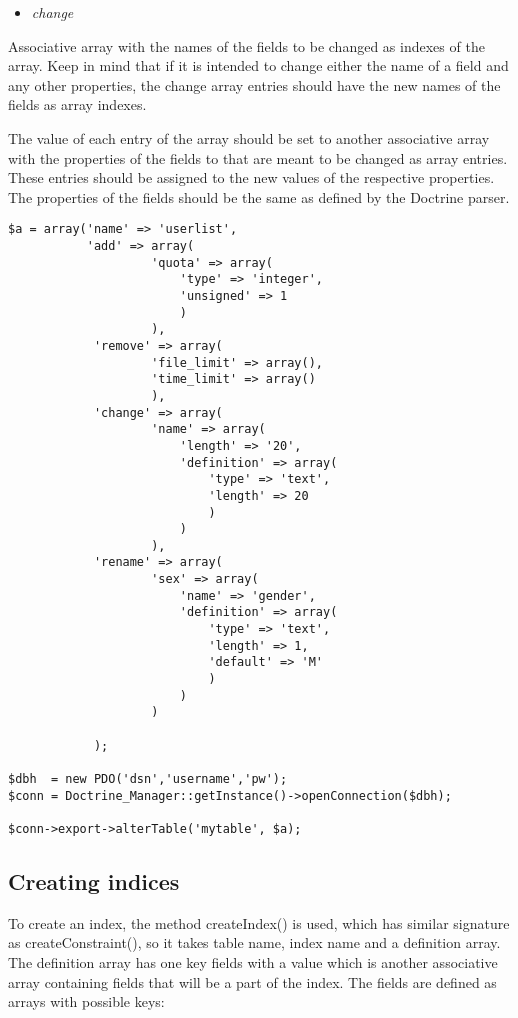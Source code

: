 \documentclass[11pt,a4paper]{report}
\begin{document}
\begin{itemize}
\item{\textsl{change}}
\end{itemize}
Associative array with the names of the fields to be changed as indexes of the array. Keep in mind that if it is intended to change either the name of a field and any other properties, the change array entries should have the new names of the fields as array indexes.

The value of each entry of the array should be set to another associative array with the properties of the fields to that are meant to be changed as array entries. These entries should be assigned to the new values of the respective properties. The properties of the fields should be the same as defined by the Doctrine parser.

\begin{verbatim}
$a = array('name' => 'userlist',
           'add' => array(
                    'quota' => array(
                        'type' => 'integer',
                        'unsigned' => 1
                        )
                    ),
            'remove' => array(
                    'file_limit' => array(),
                    'time_limit' => array()
                    ),
            'change' => array(
                    'name' => array(
                        'length' => '20',
                        'definition' => array(
                            'type' => 'text',
                            'length' => 20
                            )
                        )
                    ),
            'rename' => array(
                    'sex' => array(
                        'name' => 'gender',
                        'definition' => array(
                            'type' => 'text',
                            'length' => 1,
                            'default' => 'M'
                            )
                        )
                    )

            );

$dbh  = new PDO('dsn','username','pw');
$conn = Doctrine_Manager::getInstance()->openConnection($dbh);

$conn->export->alterTable('mytable', $a);
\end{verbatim}

\subsection{Creating indices}
To create an index, the method createIndex() is used, which has similar signature as createConstraint(), so it takes table name, index name and a definition array. The definition array has one key fields with a value which is another associative array containing fields that will be a part of the index. The fields are defined as arrays with possible keys:
\end{document}
